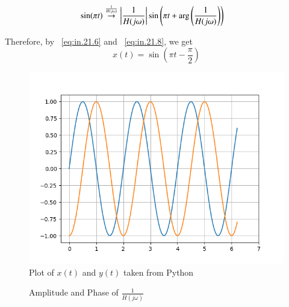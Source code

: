 \documentclass[journal,12pt,twocolumn]{IEEEtran}
\newcommand{\phase}[1]{\text{arg}\left(#1\right)}
\newcommand{\system}[1]{\stackrel{#1}{\rightarrow}}
\theoremstyle{remark}
\begin{document}
\begin{align}
  \sin(\pi t)&\system{\frac{1}{H(j\omega)}}\abs{\frac{1}{H(j\omega)}}\sin\left(\pi t  + \phase{\frac{1}{H(j\omega)}}\right)\label{eq:in.21.8}
\end{align}

Therefore, by ~\eqref{eq:in.21.6} and ~\eqref{eq:in.21.8}, we get
\begin{equation}
    x(t)=\sin\left(\pi t -\frac{\pi}{2}\right)
\end{equation}

\begin{figure}[h]
  \centering
  \includegraphics[width=\columnwidth]{2023/IN/21/figs/figure3.png} 
  \captionsetup{justification=centering}
  \caption{Plot of $x(t)$ and $y(t)$ taken from Python}
  \label{fig:in.21.f3}
\end{figure}

\begin{figure}[h]
  \centering

  \hfill
  \caption{Amplitude and Phase of $\frac{1}{H(j\omega)}$}
  \label{fig:in.21.subfig}
\end{figure}

\end{document}
